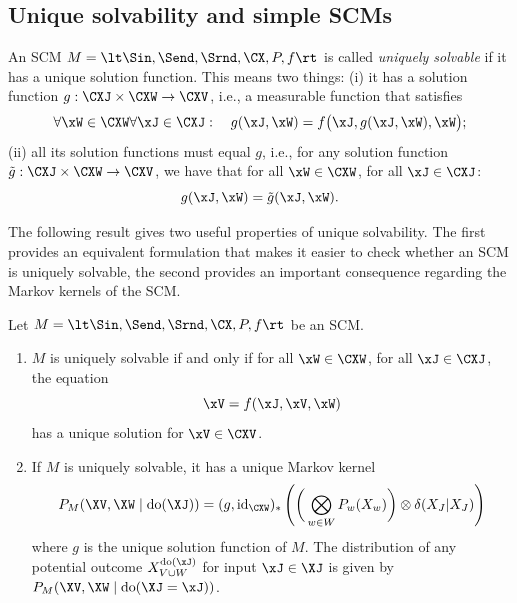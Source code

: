 \subsection{Unique solvability and simple SCMs}

\begin{Def}\label{def:scm_unique_solvability}
  An SCM $M = \lt \Sin, \Send, \Srnd, \CX, P, f \rt$ is called \emph{uniquely solvable} if it has a unique solution function. This means two things: (i) it has a solution function $g : \CXJ \times \CXW \to \CXV$, i.e., a measurable function
  that satisfies
  \begin{equation}\label{eq:scm_unique_solvability}
    \forall \xW\in\CXW \forall \xJ\in\CXJ: \quad g(\xJ,\xW) = f\big(\xJ, g(\xJ,\xW), \xW\big);
  \end{equation}
  (ii) all its solution functions must equal $g$, i.e., for any solution function $\tilde{g} : \CXJ \times \CXW \to \CXV$,
  we have that for all $\xW\in\CXW$, for all $\xJ\in\CXJ$:
  $$g(\xJ,\xW) = \tilde{g}(\xJ,\xW).$$
\end{Def}
The following result gives two useful properties of unique solvability. 
The first provides an equivalent formulation that makes it easier to check whether an SCM
is uniquely solvable, the second provides an important consequence regarding
the Markov kernels of the SCM.
\begin{Thm}\label{thm:scm_unique_solvability}
  Let $M = \lt \Sin, \Send, \Srnd, \CX, P, f \rt$ be an SCM.
  \begin{enumerate}
    \item $M$ is uniquely solvable if and only if 
      for all $\xW\in\CXW$, for all $\xJ \in \CXJ$, the equation
      $$\xV = f(\xJ,\xV,\xW)$$
      has a unique solution for $\xV\in\CXV$.
    \item If $M$ is uniquely solvable, it has a unique Markov kernel 
      $$P_{M}(\XV,\XW \mid\doit(\XJ)) = (g,\id_{\CXW})_* \lp \bigg( \bigotimes_{w\in W} P_w(X_w) \bigg) \otimes \delta(X_J|X_J) \rp $$
      where $g$ is the unique solution function of $M$.
      The distribution of any potential outcome $X^{\doit(\xJ)}_{V\cup W}$ for input $\xJ\in\XJ$ is given by $P_{M}(\XV,\XW \mid \doit(\XJ=\xJ))$.
  \end{enumerate}
\end{Thm}

